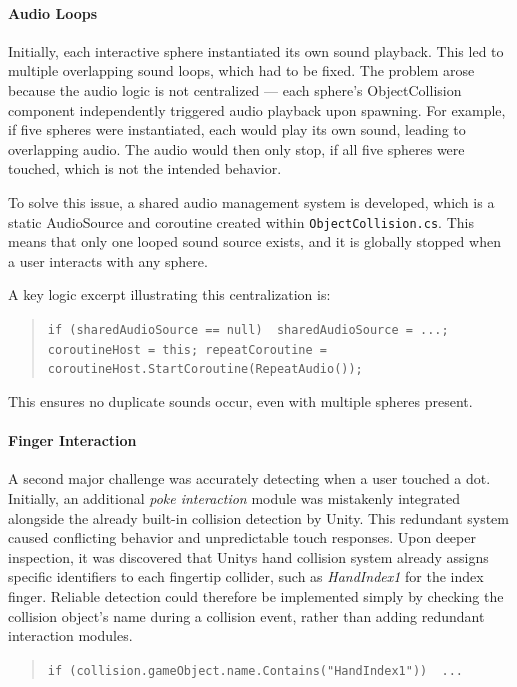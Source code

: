 \paragraph{Audio Loops} 
Initially, each interactive sphere instantiated its own sound playback. This led to multiple overlapping sound loops, which had to be fixed. The problem arose because the audio logic is not centralized — each sphere's ObjectCollision component independently triggered audio playback upon spawning. For example, if five spheres were instantiated, each would play its own sound, leading to overlapping audio. The audio would then only stop, if all five spheres were touched, which is not the intended behavior.

\vspace{1em}

To solve this issue, a shared audio management system is developed, which is a static AudioSource and coroutine created within \texttt{ObjectCollision.cs}. This means that only one looped sound source exists, and it is globally stopped when a user interacts with any sphere.

A key logic excerpt illustrating this centralization is:

\begin{quote} \small \texttt{if (sharedAudioSource == null) { sharedAudioSource = ...; coroutineHost = this; repeatCoroutine = coroutineHost.StartCoroutine(RepeatAudio());}} \end{quote}

This ensures no duplicate sounds occur, even with multiple spheres present.

\paragraph{Finger Interaction} 
A second major challenge was accurately detecting when a user touched a dot. Initially, an additional \textit{poke interaction} module was mistakenly integrated alongside the already built-in collision detection by Unity. This redundant system caused conflicting behavior and unpredictable touch responses. Upon deeper inspection, it was discovered that Unitys hand collision system already assigns specific identifiers to each fingertip collider, such as \textit{HandIndex1} for the index finger. Reliable detection could therefore be implemented simply by checking the collision object's name during a collision event, rather than adding redundant interaction modules.

\begin{quote} \small \texttt{if (collision.gameObject.name.Contains("HandIndex1")) { ... }} \end{quote}

